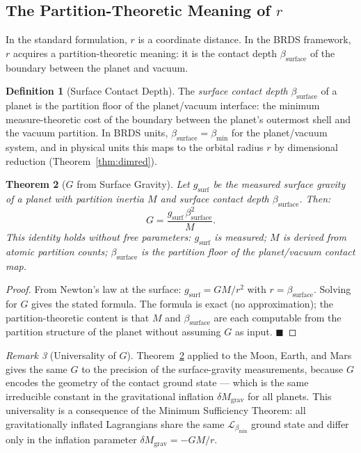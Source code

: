 \documentclass[12pt, a4paper]{article}
\theoremstyle{plain}
\newtheorem{theorem}{Theorem}[section]
\theoremstyle{definition}
\newtheorem{definition}[theorem]{Definition}
\theoremstyle{remark}
\newtheorem{remark}[theorem]{Remark}
\newcommand{\bmin}{\beta_{\min}}
\newcommand{\Lmin}{\mathcal{L}_{\bmin}}
\newcommand{\qed}{\hfill$\blacksquare$}
\begin{document}
\subsection{The Partition-Theoretic Meaning of $r$}

In the standard formulation, $r$ is a coordinate distance. In the BRDS framework,
$r$ acquires a partition-theoretic meaning: it is the contact depth
$\beta_{\mathrm{surface}}$ of the boundary between the planet and vacuum.

\begin{definition}[Surface Contact Depth]
\label{def:surfacedepth}
The \emph{surface contact depth} $\beta_{\mathrm{surface}}$ of a planet is the
partition floor of the planet/vacuum interface: the minimum measure-theoretic
cost of the boundary between the planet's outermost shell and the vacuum partition.
In BRDS units, $\beta_{\mathrm{surface}} = \bmin$ for the planet/vacuum system,
and in physical units this maps to the orbital radius $r$ by dimensional
reduction (Theorem~\ref{thm:dimred}).
\end{definition}

\begin{theorem}[$G$ from Surface Gravity]
\label{thm:gfromsurface}
Let $g_{\mathrm{surf}}$ be the measured surface gravity of a planet with
partition inertia $M$ and surface contact depth $\beta_{\mathrm{surface}}$.
Then:
\[
  G = \frac{g_{\mathrm{surf}}\,\beta_{\mathrm{surface}}^2}{M}.
\]
This identity holds without free parameters: $g_{\mathrm{surf}}$ is measured;
$M$ is derived from atomic partition counts; $\beta_{\mathrm{surface}}$ is the
partition floor of the planet/vacuum contact map.
\end{theorem}

\begin{proof}
From Newton's law at the surface: $g_{\mathrm{surf}} = GM/r^2$ with
$r = \beta_{\mathrm{surface}}$. Solving for $G$ gives the stated formula.
The formula is exact (no approximation); the partition-theoretic content is
that $M$ and $\beta_{\mathrm{surface}}$ are each computable from the
partition structure of the planet without assuming $G$ as input. \qed
\end{proof}

\begin{remark}[Universality of $G$]
Theorem~\ref{thm:gfromsurface} applied to the Moon, Earth, and Mars gives the
same $G$ to the precision of the surface-gravity measurements, because $G$
encodes the geometry of the contact ground state --- which is the same irreducible
constant in the gravitational inflation $\delta M_{\mathrm{grav}}$ for all planets.
This universality is a consequence of the Minimum Sufficiency Theorem: all
gravitationally inflated Lagrangians share the same $\Lmin$ ground state and
differ only in the inflation parameter $\delta M_{\mathrm{grav}} = -GM/r$.
\end{remark}
\end{document}
